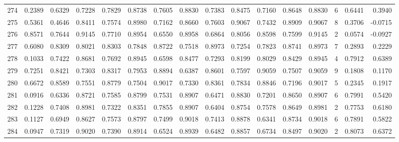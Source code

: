 \begin{tabular}{lrrrrrrrrrrrrrrr}
274 &      0.2389 &  0.6329 &  0.7228 &  0.7829 &  0.8738 &  0.7605 &  0.8830 &  0.7383 &  0.8475 &  0.7160 &   0.8648 &     0.8830 &      6 &                    0.6441 &                     0.3940 \\
275 &      0.5361 &  0.4646 &  0.8411 &  0.7574 &  0.8980 &  0.7162 &  0.8660 &  0.7603 &  0.9067 &  0.7432 &   0.8909 &     0.9067 &      8 &                    0.3706 &                    -0.0715 \\
276 &      0.8571 &  0.7644 &  0.9145 &  0.7710 &  0.8954 &  0.6550 &  0.8958 &  0.6864 &  0.8056 &  0.8598 &   0.7599 &     0.9145 &      2 &                    0.0574 &                    -0.0927 \\
277 &      0.6080 &  0.8309 &  0.8021 &  0.8303 &  0.7848 &  0.8722 &  0.7518 &  0.8973 &  0.7254 &  0.7823 &   0.8741 &     0.8973 &      7 &                    0.2893 &                     0.2229 \\
278 &      0.1033 &  0.7422 &  0.8681 &  0.7692 &  0.8945 &  0.6598 &  0.8477 &  0.7293 &  0.8199 &  0.8029 &   0.8429 &     0.8945 &      4 &                    0.7912 &                     0.6389 \\
279 &      0.7251 &  0.8421 &  0.7303 &  0.8317 &  0.7953 &  0.8894 &  0.6387 &  0.8601 &  0.7597 &  0.9059 &   0.7507 &     0.9059 &      9 &                    0.1808 &                     0.1170 \\
280 &      0.6672 &  0.8589 &  0.7551 &  0.8779 &  0.7504 &  0.9017 &  0.7330 &  0.8361 &  0.7834 &  0.8846 &   0.7196 &     0.9017 &      5 &                    0.2345 &                     0.1917 \\
281 &      0.0916 &  0.6336 &  0.8721 &  0.7585 &  0.8799 &  0.7531 &  0.8907 &  0.6471 &  0.8830 &  0.7201 &   0.8650 &     0.8907 &      6 &                    0.7991 &                     0.5420 \\
282 &      0.1228 &  0.7408 &  0.8981 &  0.7322 &  0.8351 &  0.7855 &  0.8907 &  0.6404 &  0.8754 &  0.7578 &   0.8649 &     0.8981 &      2 &                    0.7753 &                     0.6180 \\
283 &      0.1127 &  0.6949 &  0.8627 &  0.7573 &  0.8797 &  0.7499 &  0.9018 &  0.7413 &  0.8878 &  0.6341 &   0.8734 &     0.9018 &      6 &                    0.7891 &                     0.5822 \\
284 &      0.0947 &  0.7319 &  0.9020 &  0.7390 &  0.8914 &  0.6524 &  0.8939 &  0.6482 &  0.8857 &  0.6734 &   0.8497 &     0.9020 &      2 &                    0.8073 &                     0.6372 \\

\end{tabular}
